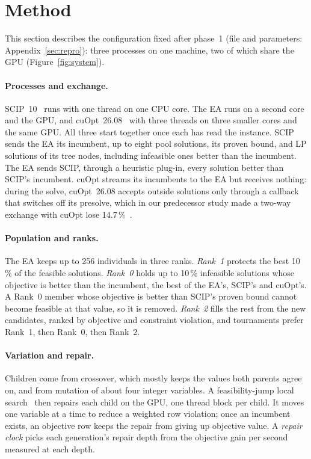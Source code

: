 \section{Method}\label{sec:method}
This section describes the configuration fixed after phase~1 (file and parameters: Appendix~\ref{sec:repro}): three
processes on one machine, two of which share the GPU (Figure~\ref{fig:system}).

\paragraph{Processes and exchange.} SCIP~10~\citep{hojny2025scip10} runs with one thread on one CPU core. The EA runs
on a second core and the GPU, and cuOpt~26.08~\citep{cuopt} with three threads on three smaller cores and the same GPU.
All three start together once each has read the instance. SCIP sends the EA its incumbent, up to eight
pool solutions, its proven bound, and LP solutions of its tree nodes, including infeasible ones better than the
incumbent. The EA sends SCIP, through a heuristic plug-in, every solution better than SCIP's incumbent. cuOpt streams
its incumbents to the EA but receives nothing: during the solve, cuOpt~26.08 accepts outside solutions only through a
callback that switches off its presolve, which in our predecessor study made a two-way exchange with cuOpt lose 14.7\,\%~\citep{orbay2026optopt}.

\paragraph{Population and ranks.} The EA keeps up to 256 individuals in three ranks. \emph{Rank~1} protects the best
10\,\% of the feasible solutions. \emph{Rank~0} holds up to 10\,\% infeasible solutions whose objective is better than
the incumbent, the best of the EA's, SCIP's and cuOpt's. A Rank~0 member whose objective is better than SCIP's proven
bound cannot become feasible at that value, so it is removed. \emph{Rank~2} fills the rest from the new candidates,
ranked by objective and constraint violation, and tournaments prefer Rank~1, then Rank~0, then Rank~2.

\paragraph{Variation and repair.} Children come from crossover, which mostly keeps the values both parents agree on,
and from mutation of about four integer variables. A feasibility-jump local search~\citep{luteberget2023feasibility}
then repairs each child on the GPU, one thread block per child. It moves one variable at a time to reduce a weighted
row violation; once an incumbent exists, an objective row keeps the repair from giving up objective value. A
\emph{repair clock} picks each generation's repair depth from the objective gain per second measured at each depth.

